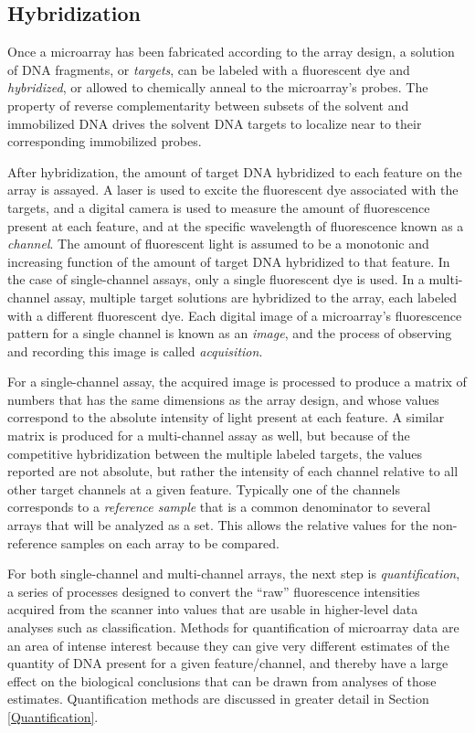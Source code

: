 \subsection{Hybridization}\label{Hybridization}

Once a microarray has been fabricated according to the array design, a solution
of DNA fragments, or \emph{targets}, can be labeled with a fluorescent dye and
\emph{hybridized}, or allowed to chemically anneal to the microarray's probes.
The property of reverse complementarity between subsets of the solvent and
immobilized DNA drives the solvent DNA targets to localize near to their
corresponding immobilized probes.

After hybridization, the amount of target DNA hybridized to each feature on the
array is assayed.  A laser is used to excite the fluorescent dye associated
with the targets, and a digital camera is used to measure the amount of
fluorescence present at each feature, and at the specific wavelength of
fluorescence known as a \emph{channel}.  The amount of fluorescent light is
assumed to be a monotonic and increasing function of the amount of target DNA
hybridized to that feature.  In the case of single-channel assays, only a
single fluorescent dye is used.  In a multi-channel assay, multiple target
solutions are hybridized to the array, each labeled with a different
fluorescent dye.  Each digital image of a microarray's fluorescence pattern for
a single channel is known as an \emph{image}, and the process of observing and
recording this image is called \emph{acquisition}.

For a single-channel assay, the acquired image is processed to produce a matrix
of numbers that has the same dimensions as the array design, and whose values
correspond to the absolute intensity of light present at each feature.  A
similar matrix is produced for a multi-channel assay as well, but because of
the competitive hybridization between the multiple labeled targets, the values
reported are not absolute, but rather the intensity of each channel relative to
all other target channels at a given feature.  Typically one of the channels
corresponds to a \emph{reference sample} that is a common denominator to
several arrays that will be analyzed as a set.  This allows the relative values
for the non-reference samples on each array to be compared.

For both single-channel and multi-channel arrays, the next step is
\emph{quantification}, a series of processes designed to convert the ``raw''
fluorescence intensities acquired from the scanner into values that are usable
in higher-level data analyses such as classification.  Methods for
quantification of microarray data are an area of intense interest
\cite{mas5,affy4,mbei,rma,vsn,gcrma,affyplm,seo,affybench} because they can
give very different estimates of the quantity of DNA present for a given
feature/channel, and thereby have a large effect on the biological conclusions
that can be drawn from analyses of those estimates.  Quantification methods are
discussed in greater detail in Section \ref{Quantification}.

